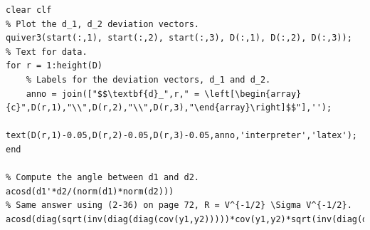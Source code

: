 \begin{enumerate}[label=(\alph*)]
\begin{lstlisting}
clear clf
% Plot the d_1, d_2 deviation vectors.
quiver3(start(:,1), start(:,2), start(:,3), D(:,1), D(:,2), D(:,3));
% Text for data.
for r = 1:height(D)
    % Labels for the deviation vectors, d_1 and d_2.
    anno = join(["$$\textbf{d}_",r," = \left[\begin{array}{c}",D(r,1),"\\",D(r,2),"\\",D(r,3),"\end{array}\right]$$"],'');
    text(D(r,1)-0.05,D(r,2)-0.05,D(r,3)-0.05,anno,'interpreter','latex');
end

% Compute the angle between d1 and d2.
acosd(d1'*d2/(norm(d1)*norm(d2)))
% Same answer using (2-36) on page 72, R = V^{-1/2} \Sigma V^{-1/2}.
acosd(diag(sqrt(inv(diag(diag(cov(y1,y2)))))*cov(y1,y2)*sqrt(inv(diag(diag(cov(y1,y2))))),1))
    \end{lstlisting}
\end{enumerate}
